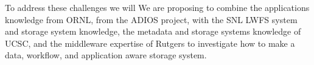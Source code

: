 To address these challenges we will We are proposing to combine the applications
knowledge from ORNL, from the ADIOS project, with the SNL LWFS system and storage system knowledge, the
metadata and storage systems knowledge of UCSC, and the middleware expertise of
Rutgers to investigate how to make a data, workflow, and application aware
storage system.


